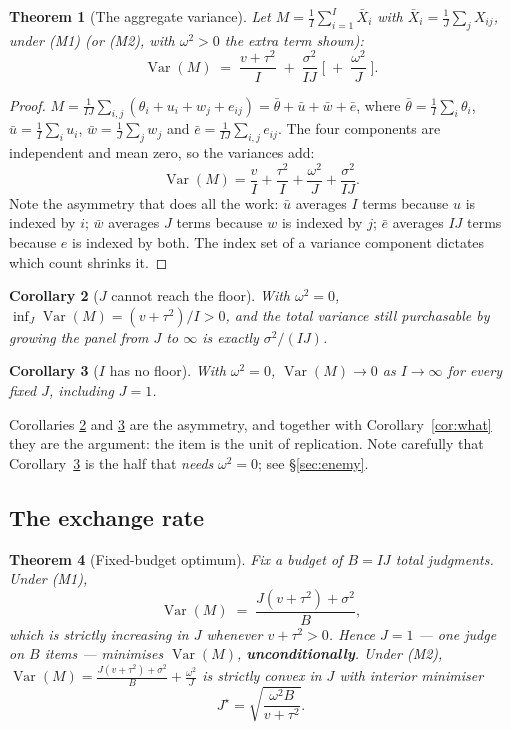 \documentclass[11pt]{article}
\theoremstyle{plain}
\newtheorem{theorem}{Theorem}
\newtheorem{corollary}[theorem]{Corollary}
\theoremstyle{definition}
\theoremstyle{remark}
\newcommand{\Var}{\operatorname{Var}}
\begin{document}
\begin{theorem}[The aggregate variance]\label{thm:prop2}
Let $M=\frac{1}{I}\sum_{i=1}^{I}\bar X_i$ with $\bar X_i=\frac1J\sum_j X_{ij}$, under
\textup{(M1)} (or \textup{(M2)}, with $\omega^2>0$ the extra term shown):
\[
\Var(M)\;=\;\frac{v+\tau^2}{I}\;+\;\frac{\sigma^2}{IJ}\;\Big[\;+\;\frac{\omega^2}{J}\;\Big].
\]
\end{theorem}

\begin{proof}
$M=\frac{1}{IJ}\sum_{i,j}(\theta_i+u_i+w_j+e_{ij})
=\bar\theta+\bar u+\bar w+\bar e$, where
$\bar\theta=\frac1I\sum_i\theta_i$, $\bar u=\frac1I\sum_i u_i$, $\bar w=\frac1J\sum_j w_j$ and
$\bar e=\frac{1}{IJ}\sum_{i,j}e_{ij}$. The four components are independent and mean zero, so the
variances add:
\[
\Var(M)=\frac{v}{I}+\frac{\tau^2}{I}+\frac{\omega^2}{J}+\frac{\sigma^2}{IJ}.
\]
Note the asymmetry that does all the work: $\bar u$ averages $I$ terms because $u$ is indexed by
$i$; $\bar w$ averages $J$ terms because $w$ is indexed by $j$; $\bar e$ averages $IJ$ terms
because $e$ is indexed by both. The index set of a variance component dictates which count
shrinks it.
\end{proof}

\begin{corollary}[$J$ cannot reach the floor]\label{cor:Jfloor}
With $\omega^2=0$, $\inf_J \Var(M)=(v+\tau^2)/I>0$, and the total variance still purchasable by
growing the panel from $J$ to $\infty$ is exactly $\sigma^2/(IJ)$.
\end{corollary}

\begin{corollary}[$I$ has no floor]\label{cor:Ifloor}
With $\omega^2=0$, $\Var(M)\to 0$ as $I\to\infty$ for every fixed $J$, including $J=1$.
\end{corollary}

Corollaries \ref{cor:Jfloor} and \ref{cor:Ifloor} are the asymmetry, and together with
Corollary~\ref{cor:what} they are the argument: the item is the unit of replication. Note
carefully that Corollary~\ref{cor:Ifloor} is the half that \emph{needs} $\omega^2=0$; see
\S\ref{sec:enemy}.

\subsection{The exchange rate}

\begin{theorem}[Fixed-budget optimum]\label{thm:budget}
Fix a budget of $B=IJ$ total judgments. Under \textup{(M1)},
\[
\Var(M)\;=\;\frac{J(v+\tau^2)+\sigma^2}{B},
\]
which is strictly increasing in $J$ whenever $v+\tau^2>0$. Hence $J=1$ --- one judge on $B$
items --- minimises $\Var(M)$, \textbf{unconditionally}. Under \textup{(M2)},
$\Var(M)=\frac{J(v+\tau^2)+\sigma^2}{B}+\frac{\omega^2}{J}$ is strictly convex in $J$ with
interior minimiser
\[
J^\star=\sqrt{\frac{\omega^2 B}{v+\tau^2}}.
\]
\end{theorem}
\end{document}
